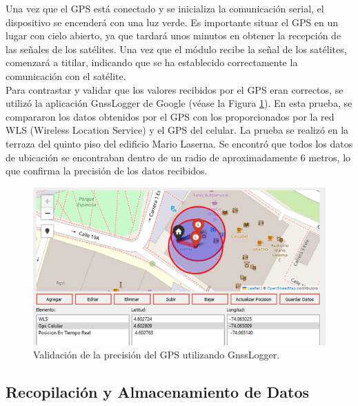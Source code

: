         Una vez que el GPS está conectado y se inicializa la comunicación serial, el dispositivo se encenderá con una luz verde. Es importante situar el GPS en un lugar con cielo abierto, ya que tardará unos minutos en obtener la recepción de las señales de los satélites. Una vez que el módulo recibe la señal de los satélites, comenzará a titilar, indicando que se ha establecido correctamente la comunicación con el satélite. \\

        Para contrastar y validar que los valores recibidos por el GPS eran correctos, se utilizó la aplicación GnssLogger de Google (véase la Figura \ref{fig:gpsGnss}). En esta prueba, se compararon los datos obtenidos por el GPS con los proporcionados por la red WLS (Wireless Location Service) y el GPS del celular. La prueba se realizó en la terraza del quinto piso del edificio Mario Laserna. Se encontró que todos los datos de ubicación se encontraban dentro de un radio de aproximadamente 6 metros, lo que confirma la precisión de los datos recibidos. \\ 

        \begin{figure}[H]
            \centering
            \includegraphics[width=10 cm]{Imagenes/Firmware/GPS.png}
            \caption{Validación de la precisión del GPS utilizando GnssLogger.}
            \label{fig:gpsGnss}
        \end{figure}





\subsection{Recopilación y Almacenamiento de Datos}

